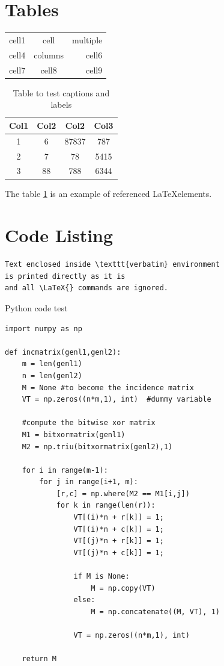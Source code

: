 \documentclass[a4paper,12pt]{article}
\begin{document}
\section{Tables}

\begin{center}
\begin{tabular}{ |l|cr|| } 
 \hline
 cell1 & cell & multiple \\ 
 cell4 & columns & cell6 \\ 
 cell7 & cell8 & cell9 \\ 
 \hline
\end{tabular}
\end{center}
\begin{table}[h!]
\centering
\begin{tabular}{||c c c c||} 
 \hline
 Col1 & Col2 & Col2 & Col3 \\ [0.5ex] 
 \hline\hline
 1 & 6 & 87837 & 787 \\ 
 2 & 7 & 78 & 5415 \\
 3 & 88 & 788 & 6344 \\ [1ex] 
 \hline
\end{tabular}
\caption{Table to test captions and labels}
\label{table:1}
\end{table}
The table \ref{table:1} is an example of referenced \LaTeX elements.

\clearpage
\section{Code Listing}
\begin{verbatim}
Text enclosed inside \texttt{verbatim} environment 
is printed directly as it is
and all \LaTeX{} commands are ignored.
\end{verbatim}

Python code test

\begin{lstlisting}
import numpy as np
    
def incmatrix(genl1,genl2):
    m = len(genl1)
    n = len(genl2)
    M = None #to become the incidence matrix
    VT = np.zeros((n*m,1), int)  #dummy variable
    
    #compute the bitwise xor matrix
    M1 = bitxormatrix(genl1)
    M2 = np.triu(bitxormatrix(genl2),1) 

    for i in range(m-1):
        for j in range(i+1, m):
            [r,c] = np.where(M2 == M1[i,j])
            for k in range(len(r)):
                VT[(i)*n + r[k]] = 1;
                VT[(i)*n + c[k]] = 1;
                VT[(j)*n + r[k]] = 1;
                VT[(j)*n + c[k]] = 1;
                
                if M is None:
                    M = np.copy(VT)
                else:
                    M = np.concatenate((M, VT), 1)
                
                VT = np.zeros((n*m,1), int)
    
    return M
\end{lstlisting}
\end{document}
